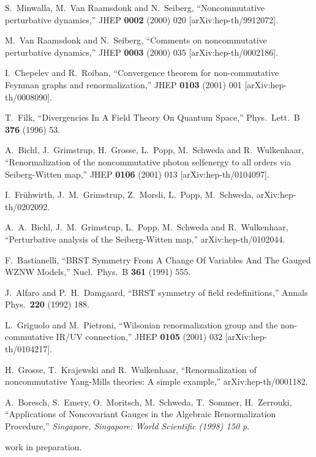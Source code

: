 \documentclass[a4paper,12pt]{article}
\begin{document}
\begin{thebibliography}{99}
S.~Minwalla, M.~Van Raamsdonk and N.~Seiberg,
``Noncommutative perturbative dynamics,''
JHEP {\bf 0002} (2000) 020
[arXiv:hep-th/9912072].

M.~Van Raamsdonk and N.~Seiberg,
``Comments on noncommutative perturbative dynamics,''
JHEP {\bf 0003} (2000) 035
[arXiv:hep-th/0002186].


I.~Chepelev and R.~Roiban,
``Convergence theorem for non-commutative Feynman graphs and  renormalization,''
JHEP {\bf 0103} (2001) 001
[arXiv:hep-th/0008090].

T.~Filk,
``Divergencies In A Field Theory On Quantum Space,''
Phys.\ Lett.\ B {\bf 376} (1996) 53.

A.~Bichl, J.~Grimstrup, H.~Grosse, L.~Popp, M.~Schweda and R.~Wulkenhaar,
``Renormalization of the noncommutative photon selfenergy to all orders via Seiberg-Witten map,''
JHEP {\bf 0106} (2001) 013
[arXiv:hep-th/0104097].

I.~Fr\"uhwirth, J.~M.~Grimstrup, Z.~Morsli, L.~Popp, M.~Schweda, 
arXiv:hep-th/0202092.

A.~A.~Bichl, J.~M.~Grimstrup, L.~Popp, M.~Schweda and R.~Wulkenhaar,
``Perturbative analysis of the Seiberg-Witten map,''
arXiv:hep-th/0102044.

F.~Bastianelli,
``BRST Symmetry From A Change Of Variables And The Gauged WZNW Models,''
Nucl.\ Phys.\ B {\bf 361} (1991) 555.

J.~Alfaro and P.~H.~Damgaard,
``BRST symmetry of field redefinitions,''
Annals Phys.\  {\bf 220} (1992) 188.

L.~Griguolo and M.~Pietroni,
``Wilsonian renormalization group and the non-commutative IR/UV  connection,''
JHEP {\bf 0105} (2001) 032
[arXiv:hep-th/0104217].

H.~Grosse, T.~Krajewski and R.~Wulkenhaar,
``Renormalization of noncommutative Yang-Mills theories: A simple  example,''
arXiv:hep-th/0001182.

A.~Boresch, S.~Emery, O.~Moritsch, M.~Schweda, T.~Sommer, H.~Zerrouki,
``Applications of Noncovariant Gauges in the Algebraic Renormalization Procedure,''
{\it Singapore, Singapore: World Scientific (1998) 150 p}.

work in preparation.
\end{thebibliography}
\end{document}

